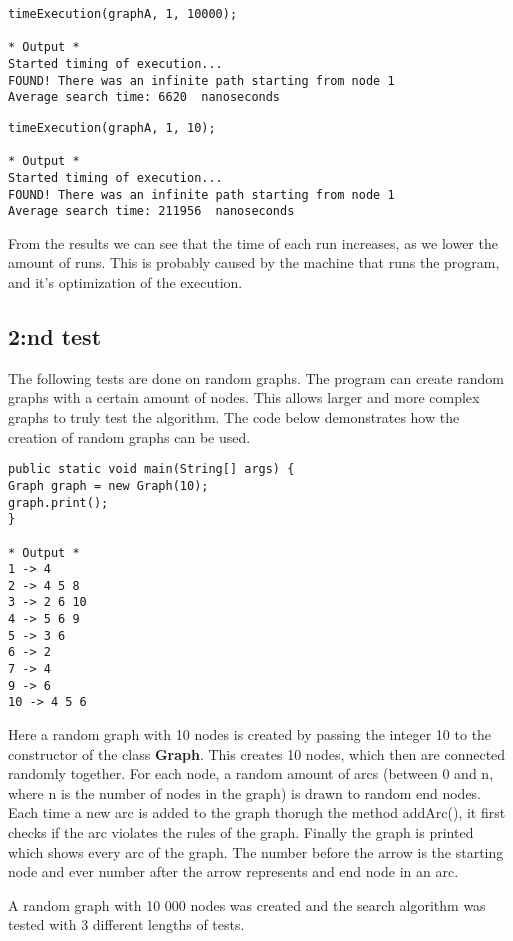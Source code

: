 \documentclass[]{article}
\begin{document}
\begin{lstlisting}
timeExecution(graphA, 1, 10000);

* Output *
Started timing of execution...
FOUND! There was an infinite path starting from node 1
Average search time: 6620  nanoseconds
\end{lstlisting}

\begin{lstlisting}
timeExecution(graphA, 1, 10);

* Output *
Started timing of execution...
FOUND! There was an infinite path starting from node 1
Average search time: 211956  nanoseconds
\end{lstlisting}

From the results we can see that the time of each run increases, as we lower the amount of runs. This is probably caused by the machine that runs the program, and it's optimization of the execution.

\subsection*{2:nd test}

The following tests are done on random graphs. The program can create random graphs with a certain amount of nodes. This allows larger and more complex graphs to truly test the algorithm. The code below demonstrates how the creation of random graphs can be used. 

\begin{lstlisting}
public static void main(String[] args) {
Graph graph = new Graph(10);
graph.print();
}

* Output *
1 -> 4 
2 -> 4 5 8 
3 -> 2 6 10 
4 -> 5 6 9 
5 -> 3 6 
6 -> 2 
7 -> 4 
9 -> 6 
10 -> 4 5 6
\end{lstlisting}

Here a random graph with 10 nodes is created by passing the integer 10 to the constructor of the class \textbf{Graph}. This creates 10 nodes, which then are connected randomly together. For each node, a random amount of arcs (between 0 and n, where n is the number of nodes in the graph) is drawn to random end nodes. Each time a new arc is added to the graph thorugh the method addArc(), it first checks if the arc violates the rules of the graph. Finally the graph is printed which shows every arc of the graph. The number before the arrow is the starting node and ever number after the arrow represents and end node in an arc.

A random graph with 10 000 nodes was created and the search algorithm was tested with 3 different lengths of tests.
\end{document}
